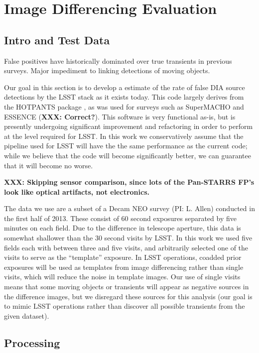 \section{Image Differencing Evaluation}

\subsection{Intro and Test Data}

False positives have historically dominated over true transients in previous
surveys. \citep{denneau13, goldstein15, kessler15} Major impediment to linking
detections of moving objects.

Our goal in this section is to develop a estimate of the rate of
false DIA source detections by the LSST stack as it exists today. This code
largely derives from the HOTPANTS package \citep{becker15}, as was used for
surveys such as SuperMACHO and ESSENCE (\textbf{XXX: Correct?}). This software
is very functional as-is, but is presently undergoing significant improvement
and refactoring in order to perform at the level required for LSST. In this work
we conservatively assume that the pipeline used for LSST will have the the same
performance as the current code; while we believe that the code will become
significantly better, we can guarantee that it will become no worse.

\textbf{XXX: Skipping sensor comparison, since lots of the Pan-STARRS FP's look like
optical artifacts, not electronics.}

The data we use are a subset of a Decam NEO survey (PI: L. Allen) conducted in
the first half of 2013. These consist of 60 second exposures separated by five
minutes on each field. Due to the difference in telescope aperture, this data is
somewhat shallower than the 30 second visits by LSST. In this work we used five
fields each with between three and five visits, and arbitrarily selected one of
the visits to serve as the ``template'' exposure. In LSST operations, coadded
prior exposures will be used as templates from image differencing rather than
single visits, which will reduce the noise in template images. Our use of single
visits means that some moving objects or transients will appear as negative
sources in the difference images, but we disregard these sources for this
analysis (our goal is to mimic LSST operations rather than discover all possible
transients from the given dataset).

\subsection{Processing}

